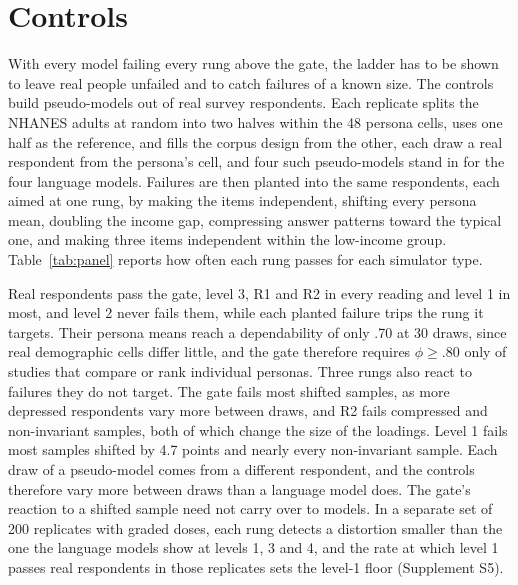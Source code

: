 
\section{Controls}
\label{sec:controls}

With every model failing every rung above the gate, the ladder has to be shown to leave real people unfailed and to catch failures of a known size.
The controls build pseudo-models out of real survey respondents.
Each replicate splits the NHANES adults at random into two halves within the 48 persona cells, uses one half as the reference, and fills the corpus design from the other, each draw a real respondent from the persona's cell, and four such pseudo-models stand in for the four language models.
Failures are then planted into the same respondents, each aimed at one rung, by making the items independent, shifting every persona mean, doubling the income gap, compressing answer patterns toward the typical one, and making three items independent within the low-income group.
Table~\ref{tab:panel} reports how often each rung passes for each simulator type.


\FloatBarrier

Real respondents pass the gate, level 3, R1 and R2 in every reading and level 1 in most, and level 2 never fails them, while each planted failure trips the rung it targets. %
Their persona means reach a dependability of only .70 at 30 draws, since real demographic cells differ little, and the gate therefore requires $\phi \ge .80$ only of studies that compare or rank individual personas. %
Three rungs also react to failures they do not target.
The gate fails most shifted samples, as more depressed respondents vary more between draws, and R2 fails compressed and non-invariant samples, both of which change the size of the loadings.
Level 1 fails most samples shifted by 4.7 points and nearly every non-invariant sample. %
Each draw of a pseudo-model comes from a different respondent, and the controls therefore vary more between draws than a language model does.
The gate's reaction to a shifted sample need not carry over to models.
In a separate set of 200 replicates with graded doses, each rung detects a distortion smaller than the one the language models show at levels 1, 3 and 4, and the rate at which level 1 passes real respondents in those replicates sets the level-1 floor (Supplement S5).

